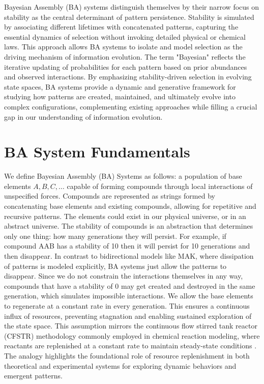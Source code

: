 \documentclass[entropy,article,submit,pdftex,moreauthors]{Definitions/mdpi}
\begin{document}
Bayesian Assembly (BA) systems distinguish themselves by their narrow focus on stability as the central determinant of pattern persistence. Stability is simulated by associating different lifetimes with concatenated patterns, capturing the essential dynamics of selection without invoking detailed physical or chemical laws. This approach allows BA systems to isolate and model selection as the driving mechanism of information evolution. The term "Bayesian" \cite{mcgrayne2011theory} reflects the iterative updating of probabilities for each pattern based on prior abundances and observed interactions. By emphasizing stability-driven selection in evolving state spaces, BA systems provide a dynamic and generative framework for studying how patterns are created, maintained, and ultimately evolve into complex configurations, complementing existing approaches while filling a crucial gap in our understanding of information evolution.

\section{BA System Fundamentals}

We define Bayesian Assembly (BA) Systems as follows: a population of base elements \( A, B, C, \dots \) capable of forming compounds through local interactions of unspecified forces. Compounds are represented as strings formed by concatenating base elements and existing compounds, allowing for repetitive and recursive patterns. The elements could exist in our physical universe, or in an abstract universe. The stability of compounds is an abstraction that determines only one thing: how many generations they will persist. For example, if compound AAB has a stability of 10 then it will persist for 10 generations and then disappear. In contrast to bidirectional models like MAK, where dissipation of patterns is modeled explicitly, BA systems just allow the patterns to disappear. Since we do not constrain the interactions themselves in any way, compounds that have a stability of 0 may get created and destroyed in the same generation, which simulates impossible interactions. We allow the base elements to regenerate at a constant rate in every generation. This ensures a continuous influx of resources, preventing stagnation and enabling sustained exploration of the state space. This assumption mirrors the continuous flow stirred tank reactor (CFSTR) methodology commonly employed in chemical reaction modeling, where reactants are replenished at a constant rate to maintain steady-state conditions \cite{fogler1999chemical}. The analogy highlights the foundational role of resource replenishment in both theoretical and experimental systems for exploring dynamic behaviors and emergent patterns.
\end{document}
